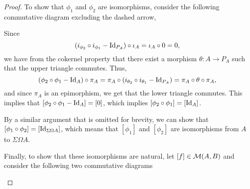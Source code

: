 \begin{proof}
    To show that \( \phi_1 \) and \( \phi_2 \) are isomorphisms, consider the following commutative diagram excluding the dashed arrow,
    \begin{center}
    \end{center}

    Since
    \[
        (i_{\phi_2} \circ i_{\phi_1} - \operatorname{Id}_{P_A}) \circ \iota_A = \iota_A \circ 0 = 0,
    \]
    we have from the cokernel property that there exist a morphism \( \theta: A \to P_A \) such that the upper triangle commutes. Thus,
    \[
        (\phi_2 \circ \phi_1 - \operatorname{Id}_A) \circ \pi_A = \pi_A \circ (i_{\theta_2} \circ i_{\theta_1} - \operatorname{Id}_{P_A}) = \pi_A \circ \theta \circ \pi_A,
    \]
    and since \( \pi_A \) is an epimorphism, we get that the lower triangle commutes. This implies that \( [\phi_2 \circ \phi_1 - \operatorname{Id}_A] = [0] \), which implies \( [\phi_2 \circ \phi_1] = [\operatorname{Id}_A] \).
    
    By a similar argument that is omitted for brevity, we can show that \( [\phi_1 \circ \phi_2] = [\operatorname{Id}_{\Sigma\Omega A}] \), which means that \( [\phi_1] \) and \( [\phi_2] \) are isomorphisms from \( A \) to \( \Sigma\Omega A \).

    Finally, to show that these isomorphisms are natural, let \( [f] \in {\mathcal{M}}(A, B) \) and consider the following two commutative diagrams
    \begin{center}
\end{center}
\end{proof}
